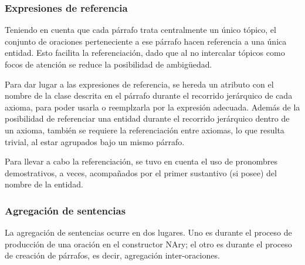\subsubsection{Expresiones de referencia}
Teniendo en cuenta que cada párrafo trata centralmente un único tópico, el conjunto de oraciones perteneciente a ese párrafo hacen referencia a una única entidad. Esto facilita la referenciación, dado que al no intercalar tópicos como focos de atención se reduce la posibilidad de ambigüedad.

Para dar lugar a las expresiones de referencia, se hereda un atributo con el nombre de la clase descrita en el párrafo durante el recorrido jerárquico de cada axioma, para poder usarla o reemplzarla por la expresión adecuada. %
Además de la posibilidad de referenciar una entidad durante el recorrido jerárquico dentro de un axioma, también se requiere la referenciación entre axiomas, lo que resulta trivial, al estar agrupados bajo un mismo párrafo. 

Para llevar a cabo la referenciación, se tuvo en cuenta el uso de pronombres demostrativos, a veces, acompañados por el primer sustantivo (si posee) del nombre de la entidad.


\subsubsection{Agregación de sentencias}
La agregación de sentencias ocurre en dos lugares. Uno es durante el proceso de producción de una oración en el constructor NAry; el otro es durante el proceso de creación de párrafos, es decir, agregación inter-oraciones.


